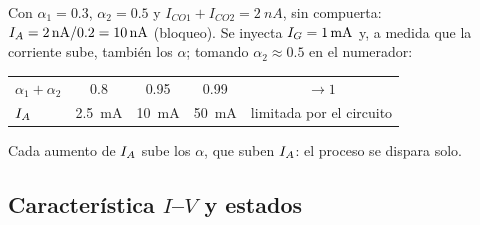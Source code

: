 \begin{ejemplo}
Con $\alpha_1=0.3$, $\alpha_2=0.5$ y $I_{CO1}+I_{CO2}=\SI{2}{nA}$, sin compuerta:
$I_{A}=\SI{2}{nA}/0.2=\SI{10}{nA}$ (bloqueo). Se inyecta $I_{G}=\SI{1}{mA}$ y, a medida que la corriente
sube, también los $\alpha$; tomando $\alpha_2\approx0.5$ en el numerador:
\begin{center}\small
\begin{tabular}{lcccc}
\toprule
$\alpha_1+\alpha_2$ & 0.8 & 0.95 & 0.99 & $\to1$ \\
$I_{A}$ & \SI{2.5}{mA} & \SI{10}{mA} & \SI{50}{mA} & limitada por el circuito \\
\bottomrule
\end{tabular}
\end{center}
Cada aumento de $I_{A}$ sube los $\alpha$, que suben $I_{A}$: el proceso se dispara solo.
\end{ejemplo}

\subsection{Característica $I$--$V$ y estados}

